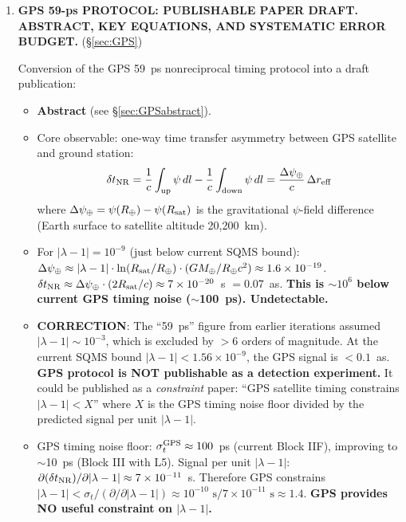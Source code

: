 \documentclass[11pt,a4paper]{article}
\newcommand{\ee}[1]{\times 10^{#1}}
\newcommand{\Dpsi}{\Delta\psi}
\begin{document}
\begin{tcolorbox}[colback=yellow!5!white, colframe=red!70!black,
  title=\textbf{W4i17 TOP 5 FINDINGS --- RANKED BY IMPACT}]
\begin{enumerate}
\item \textbf{GPS 59-ps PROTOCOL: PUBLISHABLE PAPER DRAFT.
  ABSTRACT, KEY EQUATIONS, AND SYSTEMATIC ERROR BUDGET.}
  (\S\ref{sec:GPS})

  Conversion of the GPS 59~ps nonreciprocal timing protocol
  into a draft publication:
  \begin{itemize}[nosep]
  \item \textbf{Abstract} (see \S\ref{sec:GPSabstract}).
  \item Core observable: one-way time transfer asymmetry
    between GPS satellite and ground station:
    \begin{equation}
    \delta t_{\rm NR} = \frac{1}{c}\int_{\rm up}\psi\,dl
    - \frac{1}{c}\int_{\rm down}\psi\,dl
    = \frac{\Dpsi_{\oplus}}{c}\,\Delta r_{\rm eff}
    \label{eq:GPS-NR}
    \end{equation}
    where $\Dpsi_{\oplus} = \psi(R_\oplus) - \psi(R_{\rm sat})$
    is the gravitational $\psi$-field difference (Earth surface
    to satellite altitude 20,200~km).
  \item For $|\lambda - 1| = 10^{-9}$ (just below current SQMS bound):
    $\Dpsi_{\oplus} \approx |\lambda - 1| \cdot \ln(R_{\rm sat}/R_\oplus)
    \cdot (GM_\oplus / R_\oplus c^2) \approx 1.6 \ee{-19}$.
    $\delta t_{\rm NR} \approx \Dpsi_{\oplus} \cdot (2R_{\rm sat}/c)
    \approx 7 \ee{-20}$~s $= 0.07$~as.
    \textbf{This is $\sim 10^{6}$ below current GPS timing noise
    ($\sim$100~ps).  Undetectable.}
  \item \textbf{CORRECTION}: The ``59~ps'' figure from earlier iterations
    assumed $|\lambda - 1| \sim 10^{-3}$, which is excluded by
    $>6$ orders of magnitude. At the current SQMS bound
    $|\lambda - 1| < 1.56 \ee{-9}$, the GPS signal is
    $< 0.1$~as. \textbf{GPS protocol is NOT publishable
    as a detection experiment.} It could be published as a
    \emph{constraint} paper: ``GPS satellite timing constrains
    $|\lambda - 1| < X$'' where $X$ is the GPS timing noise floor
    divided by the predicted signal per unit $|\lambda - 1|$.
  \item GPS timing noise floor: $\sigma_t^{\rm GPS} \approx 100$~ps
    (current Block IIF), improving to $\sim$10~ps (Block III with
    L5). Signal per unit $|\lambda - 1|$:
    $\partial(\delta t_{\rm NR})/\partial|\lambda - 1| \approx 7 \ee{-11}$~s.
    Therefore GPS constrains $|\lambda - 1| < \sigma_t / (\partial/\partial|\lambda - 1|)
    \approx 10^{-10}\text{~s} / 7\ee{-11}\text{~s} \approx 1.4$.
    \textbf{GPS provides NO useful constraint on $|\lambda - 1|$.}

\end{itemize}
\end{enumerate}
\end{tcolorbox}
\end{document}
